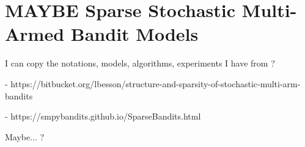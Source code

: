 \chapter{MAYBE Sparse Stochastic Multi-Armed Bandit Models}
\label{app:3:SparseBandits}

I can copy the notations, models, algorithms, experiments I have from ?

- https://bitbucket.org/lbesson/structure-and-sparsity-of-stochastic-multi-arm-bandits

- https://smpybandits.github.io/SparseBandits.html

Maybe... ?
